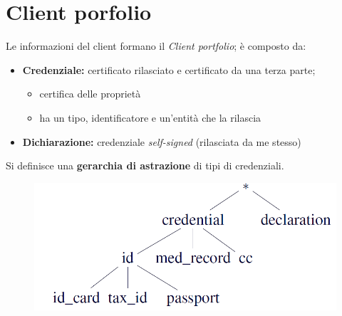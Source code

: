 \documentclass{report}
\begin{document}
\section{Client porfolio}
Le informazioni del client formano il  \textit{Client portfolio}; è composto da:
\begin{itemize}
    \item \textbf{Credenziale:} certificato rilasciato e certificato da una terza parte; 
    \begin{itemize}
        \item certifica delle proprietà
        \item ha un tipo, identificatore e un'entità che la rilascia
    \end{itemize}
    \item \textbf{Dichiarazione:} credenziale \textit{self-signed} (rilasciata da me stesso)
\end{itemize}

\noindent Si definisce una \textbf{gerarchia di astrazione} di tipi di credenziali.

\begin{figure}[ht]
    \centering
    \includegraphics[width=0.7\linewidth]{images/client portfolio.png}
\end{figure}
\end{document}
